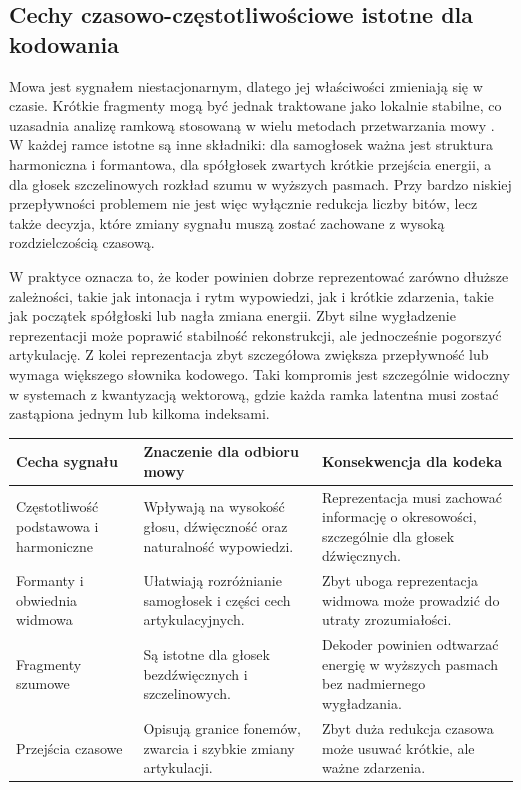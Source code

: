 \subsection{Cechy czasowo-częstotliwościowe istotne dla kodowania}
\label{subsec:cechy-czasowo-czestotliwosciowe}

Mowa jest sygnałem niestacjonarnym, dlatego jej właściwości zmieniają się w czasie. Krótkie fragmenty mogą być jednak traktowane jako lokalnie stabilne, co uzasadnia analizę ramkową stosowaną w wielu metodach przetwarzania mowy \cite{RabinerSchafer2011SpeechDSP}. W każdej ramce istotne są inne składniki: dla samogłosek ważna jest struktura harmoniczna i formantowa, dla spółgłosek zwartych krótkie przejścia energii, a dla głosek szczelinowych rozkład szumu w wyższych pasmach. Przy bardzo niskiej przepływności problemem nie jest więc wyłącznie redukcja liczby bitów, lecz także decyzja, które zmiany sygnału muszą zostać zachowane z wysoką rozdzielczością czasową.

W praktyce oznacza to, że koder powinien dobrze reprezentować zarówno dłuższe zależności, takie jak intonacja i rytm wypowiedzi, jak i krótkie zdarzenia, takie jak początek spółgłoski lub nagła zmiana energii. Zbyt silne wygładzenie reprezentacji może poprawić stabilność rekonstrukcji, ale jednocześnie pogorszyć artykulację. Z kolei reprezentacja zbyt szczegółowa zwiększa przepływność lub wymaga większego słownika kodowego. Taki kompromis jest szczególnie widoczny w systemach z kwantyzacją wektorową, gdzie każda ramka latentna musi zostać zastąpiona jednym lub kilkoma indeksami.

\begin{center}
\footnotesize
\setlength{\tabcolsep}{4pt}
\begin{tabularx}{0.96\textwidth}{>{\raggedright\arraybackslash}p{} >{\raggedright\arraybackslash}X >{\raggedright\arraybackslash}X}
\toprule
\textbf{Cecha sygnału} & \textbf{Znaczenie dla odbioru mowy} & \textbf{Konsekwencja dla kodeka} \\
\midrule
Częstotliwość podstawowa i harmoniczne & Wpływają na wysokość głosu, dźwięczność oraz naturalność wypowiedzi. & Reprezentacja musi zachować informację o okresowości, szczególnie dla głosek dźwięcznych. \\
Formanty i obwiednia widmowa & Ułatwiają rozróżnianie samogłosek i części cech artykulacyjnych. & Zbyt uboga reprezentacja widmowa może prowadzić do utraty zrozumiałości. \\
Fragmenty szumowe & Są istotne dla głosek bezdźwięcznych i szczelinowych. & Dekoder powinien odtwarzać energię w wyższych pasmach bez nadmiernego wygładzania. \\
Przejścia czasowe & Opisują granice fonemów, zwarcia i szybkie zmiany artykulacji. & Zbyt duża redukcja czasowa może usuwać krótkie, ale ważne zdarzenia. \\
\bottomrule
\end{tabularx}
\label{tab:cechy-sygnalu-mowy}
\end{center}

